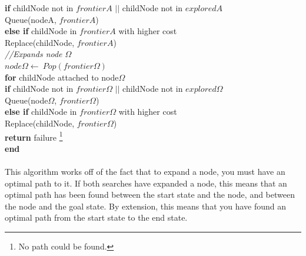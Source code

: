 \documentclass{article}
\begin{document}
\-\hspace{30mm} \textbf{if} childNode not in $frontierA$ $||$ childNode not in $exploredA$ \\
\-\hspace{40mm} Queue(nodeA, $frontierA$) \\
\-\hspace{30mm} \textbf{else if} childNode in $frontierA$ with higher cost\\
\-\hspace{40mm} Replace(childNode, $frontierA$) \\
\-\hspace{20mm} \textit{//Expands node $\Omega$} \\
\-\hspace{20mm} $node\Omega \leftarrow \ Pop(frontier\Omega)$ \\
\-\hspace{20mm} \textbf{for} childNode attached to node$\Omega$ \\
\-\hspace{30mm} \textbf{if} childNode not in $frontier\Omega$ $||$ childNode not in $explored\Omega$ \\
\-\hspace{40mm} Queue(node$\Omega$, $frontier\Omega$) \\
\-\hspace{30mm} \textbf{else if} childNode in $frontier\Omega$ with higher cost\\
\-\hspace{40mm} Replace(childNode, $frontier\Omega$) \\
\-\hspace{10mm} \textbf{return} failure \footnote{No path could be found.} \\
\textbf{end}
\\~\\
This algorithm works off of the fact that to expand a node, you must have an optimal path to it. If both searches have expanded a node, this means that an optimal path has been found between the start state and the node, and between the node and the goal state. By extension, this means that you have found an optimal path from the start state to the end state.
\end{document}
